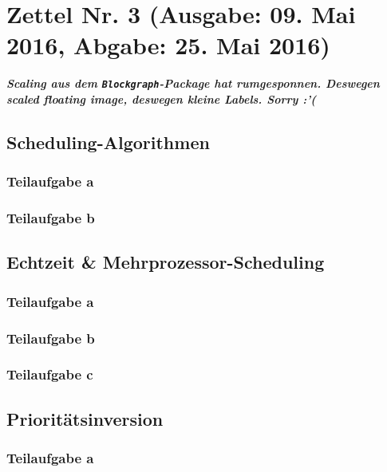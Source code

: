 \documentclass{article}
\newcommand{\sect}[3]{	%
	\newpage
	\section*{Zettel Nr. #1 (Ausgabe: #2, Abgabe: #3)}
}
\newcommand{\sus}[1]{	%
	\subsection*{#1}
}
\newcommand{\sss}[1]{	%
	\subsubsection*{Teilaufgabe #1}
}
\begin{document}
\fancyhead{}
\fancyfoot{}



\thispagestyle{empty}
\begin{center}
	\fach
	\vspace{1.5cm}
	\gruppe
	\vspace{1.5cm}
	\memberOfGroup{\memOneName}{\memOneMail}{\memOneNr}
	\memberOfGroup{\memTwoName}{\memTwoMail}{\memTwoNr}
	\memberOfGroup{\memThreeName}{\memThreeMail}{\memThreeNr}
	\vspace{1cm}
	\datumf
	
\end{center}
\newpage

\pagestyle{fancy}	%
\lhead{\memOneName}	
\chead{\memTwoName}
\rhead{\memThreeName}
\lfoot{\today}
\rfoot{\thepage}


\sect{3}{09. Mai 2016}{25. Mai 2016}
\textit{\textbf{Scaling aus dem \texttt{Blockgraph}-Package hat rumgesponnen. Deswegen scaled floating image, deswegen kleine Labels. Sorry :'(}}
\sus{Scheduling-Algorithmen}
\sss{a}
\begin{figure}[!h]
\end{figure}
\sss{b}


\sus{Echtzeit \& Mehrprozessor-Scheduling}
\sss{a}
\sss{b}
\sss{c}


\sus{Prioritätsinversion}
\sss{a}
\end{document}

